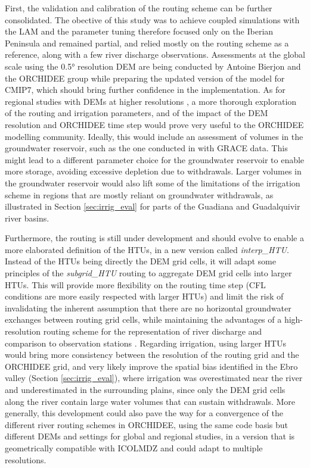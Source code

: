 First, the validation and calibration of the \native routing scheme can be further consolidated. The obective of this study was to achieve coupled simulations with the LAM and the parameter tuning therefore focused only on the Iberian Peninsula and remained partial, and relied mostly on the \std routing scheme as a reference, along with a few river discharge observations. 
Assessments at the global scale using the 0.5° resolution DEM are being conducted by Antoine Bierjon and the ORCHIDEE group while preparing the updated version of the model for CMIP7, which should bring further confidence in the implementation. 
As for regional studies with DEMs at higher resolutions \citep[such as MERIT or HydroSHEDS,][]{lehner_new_2008,warmedinger_new_2023}, a more thorough exploration of the routing and irrigation parameters, and of the impact of the DEM resolution and ORCHIDEE time step would prove very useful to the ORCHIDEE modelling community. 
Ideally, this would include an assessment of volumes in the groundwater reservoir, such as the one conducted in \citet{ngo-duc_validation_2007} with GRACE data.
This might lead to a different parameter choice for the groundwater reservoir to enable more storage, avoiding excessive depletion due to withdrawals. Larger volumes in the groundwater reservoir would also lift some of the limitations of the irrigation scheme in regions that are mostly reliant on groundwater withdrawals, as illustrated in Section \ref{sec:irrig_eval} for parts of the Guadiana and Guadalquivir river basins.

Furthermore, the \native routing is still under development and should evolve to enable a more elaborated definition of the HTUs, in a new version called \textit{interp\_HTU}.
Instead of the HTUs being directly the DEM grid cells, it will adapt some principles of the \textit{subgrid\_HTU} routing to aggregate DEM grid cells into larger HTUs. 
This will provide more flexibility on the routing time step (CFL conditions are more easily respected with larger HTUs) and limit the risk of invalidating the inherent assumption that there are no horizontal groundwater exchanges between routing grid cells, while maintaining the advantages of a high-resolution routing scheme for the representation of river discharge and comparison to observation stations \citep{nguyen-quang_orchidee-routing_2018}. Regarding irrigation, using larger HTUs would bring more consistency between the resolution of the routing grid and the ORCHIDEE grid, and very likely improve the spatial bias identified in the Ebro valley (Section \ref{sec:irrig_eval}), where irrigation was overestimated near the river and underestimated in the surrounding plains, since only the DEM grid cells along the river contain large water volumes that can sustain withdrawals.
More generally, this development could also pave the way for a convergence of the different river routing schemes in ORCHIDEE, using the same code basis but different DEMs and settings for global and regional studies, in a version that is geometrically compatible with ICOLMDZ and could adapt to multiple resolutions.

